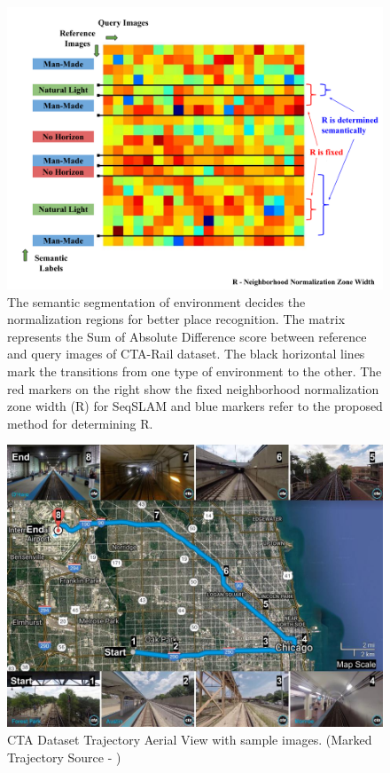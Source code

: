 \documentclass[letterpaper, 10 pt, conference]{ieeeconf}  %
\begin{document}
\begin{figure}
 \includegraphics[scale=0.33]{SADmat-NormalisationMethod}
 \caption{The semantic segmentation of environment decides the normalization regions for better place recognition. The matrix represents the Sum of Absolute Difference score between reference and query images of CTA-Rail dataset. The black horizontal lines mark the transitions from one type of environment to the other. The red markers on the right show the fixed neighborhood normalization zone width (R) for SeqSLAM and blue markers refer to the proposed method for determining R.}
 \label{fig:SADmatRdisplay}
\end{figure}

\begin{figure}[h]
 \includegraphics[scale=0.25]{cta-datasetTrajSampleImages}
 \caption{CTA Dataset Trajectory Aerial View with sample images. (Marked Trajectory Source - \cite{ctaTrajGMap})}
 \label{fig:ctaTraj}
\end{figure}
\end{document}
